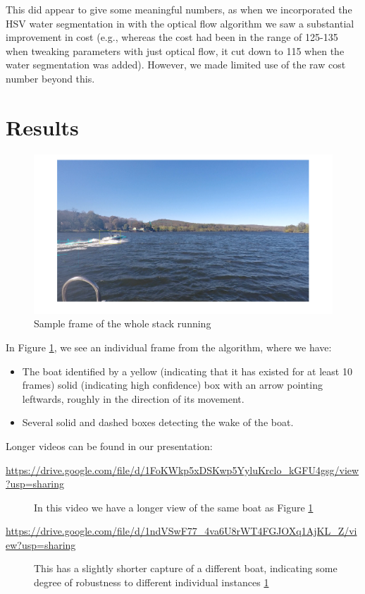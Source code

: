 \documentclass{article}
\begin{document}
This did appear to give some meaningful numbers, as when we incorporated
the HSV water segmentation in with the optical flow algorithm we saw a
substantial
improvement in cost (e.g., whereas the cost had been in the range of 125-135
when tweaking parameters with just optical flow, it cut down to 115 when the
water segmentation was added). However, we made limited use of the raw
cost number beyond this.

\section{Results}

\begin{figure}
\centering
\includegraphics[width=\textwidth]{example_detection}
\caption{Sample frame of the whole stack running}
\label{fig:example_detection}
\end{figure}

In Figure \ref{fig:example_detection}, we see an individual frame from the
algorithm, where we have:
\begin{itemize}
\item The boat identified by a yellow (indicating that it has existed for at
      least 10 frames) solid (indicating high confidence) box with an arrow
      pointing leftwards, roughly in the direction of its movement.
\item Several solid and dashed boxes detecting the wake of the boat.
\end{itemize}

Longer videos can be found in our presentation:

\begin{description}
\item[\url{https://drive.google.com/file/d/1FoKWkp5xDSKwp5YyluKrclo_kGFU4gsg/view?usp=sharing}]
  In this video we have a longer view of the same boat as Figure
  \ref{fig:example_detection}
\item[\url{https://drive.google.com/file/d/1ndVSwF77_4va6U8rWT4FGJOXq1AjKL_Z/view?usp=sharing}]
  This has a slightly shorter capture of a different boat, indicating some
  degree of robustness to different individual instances
  \ref{fig:example_detection}
\end{description}
\end{document}
